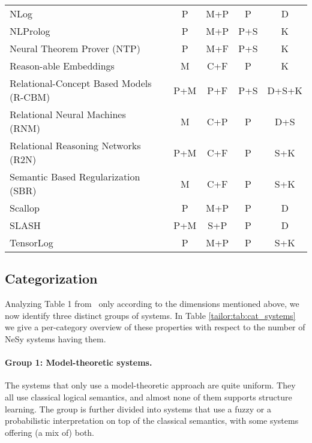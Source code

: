 \begin{table}[ht!]
\begin{tabular}{@{}l||ccc|c@{}}
NLog~\cite{tsamoura2021neural} & P &M+P & P & D \\
NLProlog~\cite{weber2019nlprolog} & P & M+P & P+S & K\\
Neural Theorem Prover (NTP)~\cite{rocktaschel2017end} & P & M+F & P+S & K\\
Reason-able Embeddings~\cite{adamski2023reason} & M	& C+F & P & K\\
Relational-Concept Based Models (R-CBM)~\cite{barbiero2023relational} & P+M & P+F & P+S & D+S+K\\
Relational Neural Machines (RNM)~\cite{marra2021relational} & M & C+P & P & D+S\\
Relational Reasoning Networks (R2N)~\cite{marra2021relational} & P+M	& C+F & P & S+K\\
Semantic Based Regularization (SBR)~\cite{diligenti2017semantic} & M & C+F & P & S+K \\
Scallop~\cite{li2023scallop} & P & M+P & P & D \\
SLASH~\cite{skryagin2022slash} &  P+M & S+P & P & D\\
TensorLog~\cite{cohen2020tensorlog} &  P & M+P & P &  S+K\\
\bottomrule
\end{tabular}
\end{table}


\subsection{Categorization}
Analyzing Table 1 from~\cite{marra2024statistical} only according to the dimensions mentioned above, we now identify three distinct groups of systems. In Table \ref{tailor:tab:cat_systems} we give a per-category overview of these properties with respect to the number of NeSy systems having them.

\paragraph{Group 1: Model-theoretic systems. }
The systems that only use a model-theoretic approach are quite uniform. They all use classical logical semantics, and almost none of them supports structure learning. The group is further divided into systems that use a fuzzy or a probabilistic interpretation on top of the classical semantics, with some systems offering (a mix of) both.
